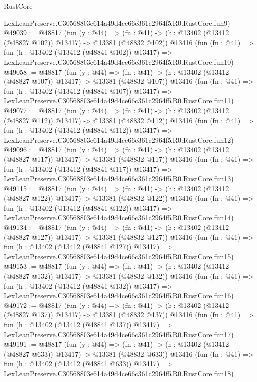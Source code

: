 \begin{lexlean}{RustCore}
\begin{coremodule}
    LexLeanPreserve.C30568803e614a49d4ce66c361c2964f5.R0.RustCore.fun9)
@49039 := @48817
    (fun (y : @44) =>
    (fn : @41) -> (h : @13402 (@13412 (@48827 @102)) @13417) -> @13381 (@48832 @102))
    @13416
    (fun (fn : @41) =>
    fun (h : @13402 (@13412 (@48841 @102)) @13417) =>
    LexLeanPreserve.C30568803e614a49d4ce66c361c2964f5.R0.RustCore.fun10)
@49058 := @48817
    (fun (y : @44) =>
    (fn : @41) -> (h : @13402 (@13412 (@48827 @107)) @13417) -> @13381 (@48832 @107))
    @13416
    (fun (fn : @41) =>
    fun (h : @13402 (@13412 (@48841 @107)) @13417) =>
    LexLeanPreserve.C30568803e614a49d4ce66c361c2964f5.R0.RustCore.fun11)
@49077 := @48817
    (fun (y : @44) =>
    (fn : @41) -> (h : @13402 (@13412 (@48827 @112)) @13417) -> @13381 (@48832 @112))
    @13416
    (fun (fn : @41) =>
    fun (h : @13402 (@13412 (@48841 @112)) @13417) =>
    LexLeanPreserve.C30568803e614a49d4ce66c361c2964f5.R0.RustCore.fun12)
@49096 := @48817
    (fun (y : @44) =>
    (fn : @41) -> (h : @13402 (@13412 (@48827 @117)) @13417) -> @13381 (@48832 @117))
    @13416
    (fun (fn : @41) =>
    fun (h : @13402 (@13412 (@48841 @117)) @13417) =>
    LexLeanPreserve.C30568803e614a49d4ce66c361c2964f5.R0.RustCore.fun13)
@49115 := @48817
    (fun (y : @44) =>
    (fn : @41) -> (h : @13402 (@13412 (@48827 @122)) @13417) -> @13381 (@48832 @122))
    @13416
    (fun (fn : @41) =>
    fun (h : @13402 (@13412 (@48841 @122)) @13417) =>
    LexLeanPreserve.C30568803e614a49d4ce66c361c2964f5.R0.RustCore.fun14)
@49134 := @48817
    (fun (y : @44) =>
    (fn : @41) -> (h : @13402 (@13412 (@48827 @127)) @13417) -> @13381 (@48832 @127))
    @13416
    (fun (fn : @41) =>
    fun (h : @13402 (@13412 (@48841 @127)) @13417) =>
    LexLeanPreserve.C30568803e614a49d4ce66c361c2964f5.R0.RustCore.fun15)
@49153 := @48817
    (fun (y : @44) =>
    (fn : @41) -> (h : @13402 (@13412 (@48827 @132)) @13417) -> @13381 (@48832 @132))
    @13416
    (fun (fn : @41) =>
    fun (h : @13402 (@13412 (@48841 @132)) @13417) =>
    LexLeanPreserve.C30568803e614a49d4ce66c361c2964f5.R0.RustCore.fun16)
@49172 := @48817
    (fun (y : @44) =>
    (fn : @41) -> (h : @13402 (@13412 (@48827 @137)) @13417) -> @13381 (@48832 @137))
    @13416
    (fun (fn : @41) =>
    fun (h : @13402 (@13412 (@48841 @137)) @13417) =>
    LexLeanPreserve.C30568803e614a49d4ce66c361c2964f5.R0.RustCore.fun17)
@49191 := @48817
    (fun (y : @44) =>
    (fn : @41) -> (h : @13402 (@13412 (@48827 @633)) @13417) -> @13381 (@48832 @633))
    @13416
    (fun (fn : @41) =>
    fun (h : @13402 (@13412 (@48841 @633)) @13417) =>
    LexLeanPreserve.C30568803e614a49d4ce66c361c2964f5.R0.RustCore.fun18)

\end{coremodule}
\end{lexlean}
